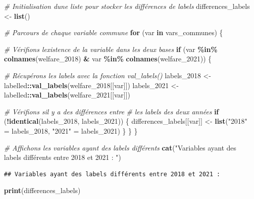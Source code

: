 \documentclass[
]{article}
\newenvironment{Shaded}{\begin{snugshade}}{\end{snugshade}}
\newcommand{\CommentTok}[1]{\textcolor[rgb]{0.56,0.35,0.01}{\textit{#1}}}
\newcommand{\ControlFlowTok}[1]{\textcolor[rgb]{0.13,0.29,0.53}{\textbf{#1}}}
\newcommand{\FunctionTok}[1]{\textcolor[rgb]{0.13,0.29,0.53}{\textbf{#1}}}
\newcommand{\NormalTok}[1]{#1}
\newcommand{\OtherTok}[1]{\textcolor[rgb]{0.56,0.35,0.01}{#1}}
\newcommand{\SpecialCharTok}[1]{\textcolor[rgb]{0.81,0.36,0.00}{\textbf{#1}}}
\newcommand{\StringTok}[1]{\textcolor[rgb]{0.31,0.60,0.02}{#1}}
\begin{document}
\begin{Shaded}
\begin{Highlighting}[]
\CommentTok{\# Initialisation d\textquotesingle{}une liste pour stocker les différences de labels}
\NormalTok{differences\_labels }\OtherTok{\textless{}{-}} \FunctionTok{list}\NormalTok{()}

\CommentTok{\# Parcours de chaque variable commune}
\ControlFlowTok{for}\NormalTok{ (var }\ControlFlowTok{in}\NormalTok{ vars\_communes) \{}

  \CommentTok{\# Vérifions l\textquotesingle{}existence de la variable dans les deux bases}
  \ControlFlowTok{if}\NormalTok{ (var }\SpecialCharTok{\%in\%} \FunctionTok{colnames}\NormalTok{(welfare\_2018) }\SpecialCharTok{\&}\NormalTok{ var }\SpecialCharTok{\%in\%} \FunctionTok{colnames}\NormalTok{(welfare\_2021)) \{}
    
    \CommentTok{\# Récupérons les labels avec la fonction val\_labels() }
\NormalTok{    labels\_2018 }\OtherTok{\textless{}{-}}\NormalTok{ labelled}\SpecialCharTok{::}\FunctionTok{val\_labels}\NormalTok{(welfare\_2018[[var]])}
\NormalTok{    labels\_2021 }\OtherTok{\textless{}{-}}\NormalTok{ labelled}\SpecialCharTok{::}\FunctionTok{val\_labels}\NormalTok{(welfare\_2021[[var]])}
    
    \CommentTok{\# Vérifions s\textquotesingle{}il y a des différences entre }
    \CommentTok{\# les labels des deux années}
    \ControlFlowTok{if}\NormalTok{ (}\SpecialCharTok{!}\FunctionTok{identical}\NormalTok{(labels\_2018, labels\_2021)) \{}
\NormalTok{      differences\_labels[[var]] }\OtherTok{\textless{}{-}} \FunctionTok{list}\NormalTok{(}\StringTok{"2018"} \OtherTok{=}\NormalTok{ labels\_2018,}
                                        \StringTok{"2021"} \OtherTok{=}\NormalTok{ labels\_2021)}
\NormalTok{    \}}
\NormalTok{  \}}
\NormalTok{\}}

\CommentTok{\# Affichons les variables ayant des labels différents}
\FunctionTok{cat}\NormalTok{(}\StringTok{"Variables ayant des labels différents entre 2018 et 2021 : "}\NormalTok{)}
\end{Highlighting}
\end{Shaded}

\begin{verbatim}
## Variables ayant des labels différents entre 2018 et 2021 :
\end{verbatim}

\begin{Shaded}
\begin{Highlighting}[]
\FunctionTok{print}\NormalTok{(differences\_labels)}
\end{Highlighting}
\end{Shaded}
\end{document}

